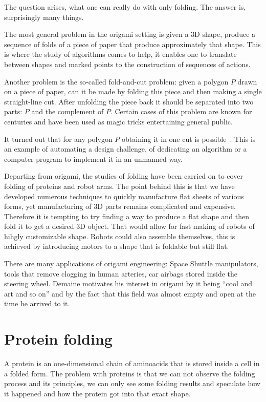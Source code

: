 \documentclass[a4paper,12pt]{article}
\begin{document}
The question arises, what one can really do with only folding. The answer is, surprisingly many things.

The most general problem in the origami setting is given a 3D shape, produce a sequence of folds of a piece of paper that produce approximately that shape. This is where the study of algorithms comes to help, it enables one to translate between shapes and marked points to the construction of sequences of actions.

Another problem is the so-called fold-and-cut problem: given a polygon \(P\) drawn on a piece of paper, can it be made by folding this piece and then making a single straight-line cut. After unfolding the piece back it should be separated into two parts: \(P\) and the complement of \(P\). Certain cases of this problem are known for centuries and have been used as magic tricks entertaining general public.

It turned out that for any polygon \(P\) obtaining it in one cut is possible~\cite{stcut}. This is an example of automating a design challenge, of dedicating an algorithm or a computer program to implement it in an unmanned way.

Departing from origami, the studies of folding have been carried on to cover folding of proteins and robot arms. The point behind this is that we have developed numerous techniques to quickly manufacture flat sheets of various forms, yet manufacturing of 3D parts remains complicated and expensive. Therefore it is tempting to try finding a way to produce a flat shape and then fold it to get a desired 3D object. That would allow for fast making of robots of hihgly customizable shape. Robots could also assemble themselves, this is achieved by introducing motors to a shape that is foldable but still flat.

There are many applications of origami engineering: Space Shuttle manipulators, tools that remove clogging in human arteries, car airbags stored inside the steering wheel. Demaine motivates his interest in origami by it being “cool and art and so on” and by the fact that this field was almost empty and open at the time he arrived to it.

\section{Protein folding}

A protein is an one-dimensional chain of aminoacids that is stored inside a cell in a folded form. The problem with proteins is that we can not observe the folding process and its principles, we can only see some folding results and speculate how it happened and how the protein got into that exact shape.
\end{document}
